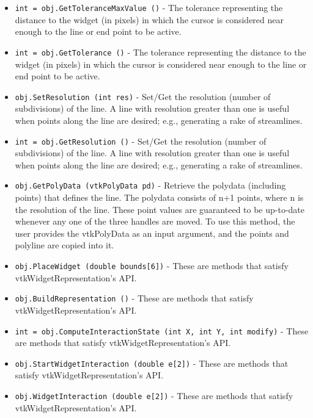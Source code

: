 \begin{itemize}
\item  \verb|int = obj.GetToleranceMaxValue ()| -  The tolerance representing the distance to the widget (in pixels) in
 which the cursor is considered near enough to the line or end point 
 to be active.

\item  \verb|int = obj.GetTolerance ()| -  The tolerance representing the distance to the widget (in pixels) in
 which the cursor is considered near enough to the line or end point 
 to be active.

\item  \verb|obj.SetResolution (int res)| -  Set/Get the resolution (number of subdivisions) of the line. A line with
 resolution greater than one is useful when points along the line are
 desired; e.g., generating a rake of streamlines.

\item  \verb|int = obj.GetResolution ()| -  Set/Get the resolution (number of subdivisions) of the line. A line with
 resolution greater than one is useful when points along the line are
 desired; e.g., generating a rake of streamlines.

\item  \verb|obj.GetPolyData (vtkPolyData pd)| -  Retrieve the polydata (including points) that defines the line.  The
 polydata consists of n+1 points, where n is the resolution of the
 line. These point values are guaranteed to be up-to-date whenever any
 one of the three handles are moved. To use this method, the user
 provides the vtkPolyData as an input argument, and the points and
 polyline are copied into it.

\item  \verb|obj.PlaceWidget (double bounds[6])| -  These are methods that satisfy vtkWidgetRepresentation's API.

\item  \verb|obj.BuildRepresentation ()| -  These are methods that satisfy vtkWidgetRepresentation's API.

\item  \verb|int = obj.ComputeInteractionState (int X, int Y, int modify)| -  These are methods that satisfy vtkWidgetRepresentation's API.

\item  \verb|obj.StartWidgetInteraction (double e[2])| -  These are methods that satisfy vtkWidgetRepresentation's API.

\item  \verb|obj.WidgetInteraction (double e[2])| -  These are methods that satisfy vtkWidgetRepresentation's API.


\end{itemize}
